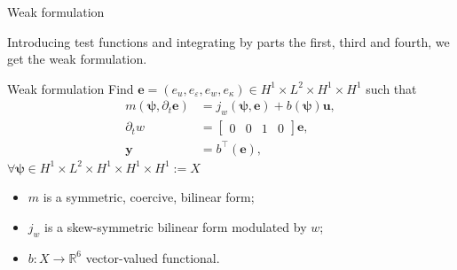 \documentclass[serif]{beamer} %
\newcommand{\bbR}{\mathbb{R}}
\begin{document}
\begin{frame}{Weak formulation}
	
	Introducing test functions and integrating by parts the first, third and fourth, we get the weak formulation.
	
	\begin{block}{Weak formulation}
		Find $\bm{e} =(e_u,  e_\varepsilon, e_w, e_\kappa) \in H^1\times L^2\times H^1\times H^1$ such that 
		\begin{equation*}
			\begin{aligned}
				m(\bm{\psi}, \partial_t \bm{e}) &= j_w(\bm{\psi}, \bm{e}) + b(\bm{\psi})\mathbf{u},\\
				\partial_t w &= \begin{bmatrix}
					0 & 0 & 1 & 0
				\end{bmatrix}\bm{e}, \\
				\mathbf{y} &= b^\top(\bm{e}),
			\end{aligned} 
		\end{equation*}
		$\forall \bm{\psi} \in H^1\times L^2\times H^1\times H^1\times H^1 := X$
		\begin{itemize}
			\item $m$ is a symmetric, coercive, bilinear form;
			\item $j_w$ is a skew-symmetric bilinear form modulated by $w$;
			\item $b: X \rightarrow \bbR^6$ vector-valued functional.
		\end{itemize}  
	\end{block}
\end{frame}
\end{document}
